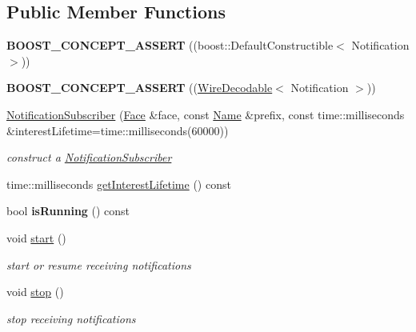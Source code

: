\subsection*{Public Member Functions}
\begin{DoxyCompactItemize}
\item 
{\bfseries B\+O\+O\+S\+T\+\_\+\+C\+O\+N\+C\+E\+P\+T\+\_\+\+A\+S\+S\+E\+RT} ((boost\+::\+Default\+Constructible$<$ Notification $>$))\hypertarget{classndn_1_1util_1_1NotificationSubscriber_a425199131097eb38cb0b207b78aa03d9}{}\label{classndn_1_1util_1_1NotificationSubscriber_a425199131097eb38cb0b207b78aa03d9}

\item 
{\bfseries B\+O\+O\+S\+T\+\_\+\+C\+O\+N\+C\+E\+P\+T\+\_\+\+A\+S\+S\+E\+RT} ((\hyperlink{classndn_1_1WireDecodable}{Wire\+Decodable}$<$ Notification $>$))\hypertarget{classndn_1_1util_1_1NotificationSubscriber_a0feb289bd33da4945b9149eaa65b2292}{}\label{classndn_1_1util_1_1NotificationSubscriber_a0feb289bd33da4945b9149eaa65b2292}

\item 
\hyperlink{classndn_1_1util_1_1NotificationSubscriber_a75215cf39f1142a7f24190c2c87005a0}{Notification\+Subscriber} (\hyperlink{classndn_1_1Face}{Face} \&face, const \hyperlink{classndn_1_1Name}{Name} \&prefix, const time\+::milliseconds \&interest\+Lifetime=time\+::milliseconds(60000))
\begin{DoxyCompactList}\small\item\em construct a \hyperlink{classndn_1_1util_1_1NotificationSubscriber}{Notification\+Subscriber} \end{DoxyCompactList}\item 
time\+::milliseconds \hyperlink{classndn_1_1util_1_1NotificationSubscriber_aac77b0d8e064ff8797cdf749872cf63e}{get\+Interest\+Lifetime} () const
\item 
bool {\bfseries is\+Running} () const\hypertarget{classndn_1_1util_1_1NotificationSubscriber_a8cc904a89164d11f5f7645ca7953f45c}{}\label{classndn_1_1util_1_1NotificationSubscriber_a8cc904a89164d11f5f7645ca7953f45c}

\item 
void \hyperlink{classndn_1_1util_1_1NotificationSubscriber_a5ab65643c1131fe472034c320a204cd6}{start} ()
\begin{DoxyCompactList}\small\item\em start or resume receiving notifications \end{DoxyCompactList}\item 
void \hyperlink{classndn_1_1util_1_1NotificationSubscriber_a666f76ce04a80ce2a187319f6eb900b6}{stop} ()\hypertarget{classndn_1_1util_1_1NotificationSubscriber_a666f76ce04a80ce2a187319f6eb900b6}{}\label{classndn_1_1util_1_1NotificationSubscriber_a666f76ce04a80ce2a187319f6eb900b6}

\begin{DoxyCompactList}\small\item\em stop receiving notifications \end{DoxyCompactList}\end{DoxyCompactItemize}
